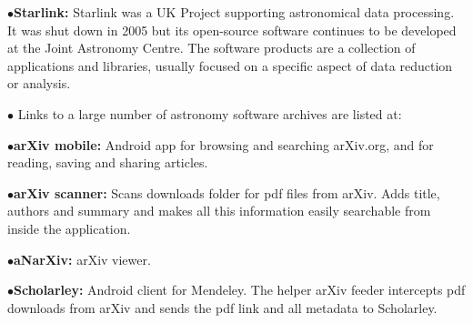 \medskip

\item{$\bullet$}{\bf Starlink:}
Starlink was a UK Project supporting astronomical data processing. It was shut down in 2005 but its open-source software continues to be developed at the Joint Astronomy Centre. The software products are a collection of applications and libraries, usually focused on a specific aspect of data reduction or analysis.
	\item{}

\medskip

\item{$\bullet$}
Links to a large number of astronomy software archives are listed at:
	\item{} 

\medskip
\medskip


\item{$\bullet$}{\bf arXiv mobile:}
Android app for browsing and searching arXiv.org, and for reading, saving and sharing articles.
	\item{}
	\item{}

\medskip

\item{$\bullet$}{\bf arXiv scanner:}
Scans downloads folder for pdf files from arXiv. Adds title, authors and summary and makes all this information easily searchable from inside the application.
	\item{}
	\item{}

\medskip

\item{$\bullet$}{\bf aNarXiv:}
arXiv viewer.
	\item{}
	\item{}

\medskip

\item{$\bullet$}{\bf Scholarley:}
Android client for Mendeley. The helper arXiv feeder intercepts pdf downloads from arXiv and sends the pdf link and all metadata to Scholarley.
	\item{}
	\item{}
	\item{}
	\item{}

